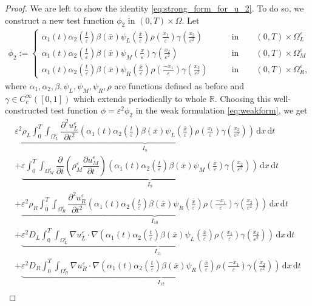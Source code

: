 \documentclass[11pt]{article}
\def\es{\varepsilon}
\def\orr{\Omega_R^\varepsilon}
\def\omm{\Omega_M^\varepsilon}
\def\oll{\Omega_L^\varepsilon}
\newcommand{\di}[1]{\,\mathrm{d}#1}
\begin{document}
\begin{proof}
We are left to show the identity \eqref{eq:strong_form_for_u_2}. To do so, we construct a new test function $\phi_2$ in $(0,T)\times\Omega$.
Let
\begin{align*}
    \phi_2:=\begin{cases} 
      \alpha_1(t)\alpha_2(\frac{t}{\es})\beta(\bar x) \psi_L(\frac{\bar x}{\es})\rho(\frac{x_1}{\es})\gamma(\frac{x_2}{\es^2}) &  \qquad \mbox{in}\qquad (0,T)\times \oll\\
      \alpha_1(t)\alpha_2(\frac{t}{\es})\beta(\bar x) \psi_M(\frac{x}{\es})\gamma(\frac{x_2}{\es^2}) & \qquad \mbox{in}\qquad (0,T)\times \omm\\
      \alpha_1(t)\alpha_2(\frac{t}{\es})\beta(\bar x) \psi_R(\frac{\bar x}{\es})\rho(\frac{-x_1}{\es})\gamma(\frac{x_2}{\es^2}) & \qquad \mbox{in}\qquad (0,T)\times \orr,
   \end{cases}
\end{align*}
where $\alpha_1,\alpha_2,\beta, \psi_L,\psi_M,\psi_R,\rho$ are functions defined as before and $\gamma\in C_c^{\infty}([0,1])$ which extends periodically to whole $\mathbb{R}$. Choosing this well-constructed test function $\phi=\es^2 \phi_2$ in the weak formulation \eqref{eq:weakform}, we get
 \begin{multline}\label{eq:phi2weakform}
   \underbrace{ \es^2 \rho_L\int_0^T\int_{\oll}  \dfrac{\partial^2u_L^\es}{\partial t^2} (\alpha_1(t)\alpha_2(\frac{t}{\es})\beta(\bar x) \psi_L(\frac{\bar x}{\es})\rho(\frac{x_1}{\es})\gamma(\frac{x_2}{\es^2}))\di{x}\di{t}}_{I_8}\\
    +  \underbrace{\es\int_0^T\int_{\omm}  \dfrac{\partial}{\partial t}\left({\rho_M^\es} \dfrac{\partial u_M^\es}{\partial t}\right) ( \alpha_1(t)\alpha_2(\frac{t}{\es})\beta(\bar x) \psi_M(\frac{x}{\es})\gamma(\frac{x_2}{\es^2}))\di{x}\di{t}}_{I_9} \\
    +   \underbrace{ \es^2 \rho_R\int_0^T\int_{\orr} \dfrac{\partial^2u_R^\es}{\partial t^2} ( \alpha_1(t)\alpha_2(\frac{t}{\es})\beta(\bar x) \psi_R(\frac{\bar x}{\es})\rho(\frac{-x_1}{\es})\gamma(\frac{x_2}{\es^2}))\di{x}\di{t}}_{I_{10}}\\
    +\underbrace{\es^2 D_L\int_0^T\int_{\oll}\nabla u_L^\es \cdot \nabla ( \alpha_1(t)\alpha_2(\frac{t}{\es})\beta(\bar x) \psi_L(\frac{\bar x}{\es})\rho(\frac{x_1}{\es})\gamma(\frac{x_2}{\es^2}))   \di{x}\di{t}}_{I_{11}}\\
    + \underbrace{\es^2 D_R\int_0^T\int_{\orr} \nabla u_R^\es\cdot\nabla ( \alpha_1(t)\alpha_2(\frac{t}{\es})\beta(\bar x) \psi_R(\frac{\bar x}{\es})\rho(\frac{-x_1}{\es})\gamma(\frac{x_2}{\es^2})) \di{x}\di{t}}_{I_{12}} \\

\end{multline}
\end{proof}
\end{document}
